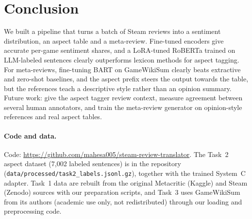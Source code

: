 \documentclass[11pt,a4paper]{article}
\begin{document}
\section{Conclusion}

We built a pipeline that turns a batch of Steam reviews into a sentiment distribution, an
aspect table and a meta-review. Fine-tuned encoders give accurate per-game sentiment shares,
and a LoRA-tuned RoBERTa trained on LLM-labeled sentences clearly outperforms lexicon methods
for aspect tagging. For meta-reviews, fine-tuning BART on GameWikiSum clearly beats extractive
and zero-shot baselines, and the aspect prefix steers the output towards the table, but the
references teach a descriptive style rather than an opinion summary. Future work: give the
aspect tagger review context, measure agreement between several human annotators, and train the
meta-review generator on opinion-style references and real aspect tables.

\paragraph{Code and data.} Code: \url{https://github.com/mahesa005/steam-review-translator}.
The Task~2 aspect dataset (7,002 labeled sentences) is in the repository
(\texttt{data/processed/task2\_labels.jsonl.gz}), together with the trained System~C adapter.
Task~1 data are rebuilt from the original Metacritic (Kaggle) and Steam (Zenodo) sources with
our preparation scripts, and Task~3 uses GameWikiSum from its authors (academic use only, not
redistributed) through our loading and preprocessing code.



\end{document}
